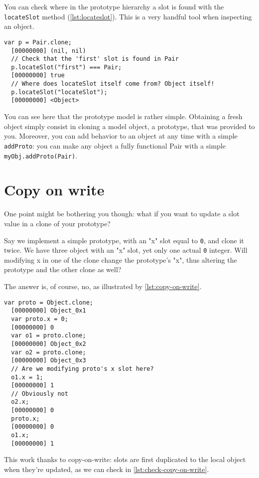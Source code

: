 \documentclass[openright,twoside,12pt]{report}
\begin{document}
You can check where in the prototype hierarchy a slot is found with
the \texttt{locateSlot} method (\autoref{lst:locateslot}). This is a very
handful tool when inspecting an object.

\begin{lstlisting}[caption=Using locateSlot, label=lst:locateslot]
  var p = Pair.clone;
  [00000000] (nil, nil)
  // Check that the 'first' slot is found in Pair
  p.locateSlot("first") === Pair;
  [00000000] true
  // Where does locateSlot itself come from? Object itself!
  p.locateSlot("locateSlot");
  [00000000] <Object>
\end{lstlisting}

You can see here that the prototype model is rather simple. Obtaining
a fresh object simply consist in cloning a model object, a prototype,
that was provided to you. Moreover, you can add behavior to an object
at any time with a simple \texttt{addProto}: you can make any object a
fully functional Pair with a simple \lstinline|myObj.addProto(Pair)|.

\section{Copy on write}

One point might be bothering you though: what if you want to update a
slot value in a clone of your prototype?

Say we implement a simple prototype, with an "x" slot equal to
\lstinline|0|, and clone it twice. We have three object with an "x"
slot, yet only one actual \lstinline|0| integer. Will modifying x in
one of the clone change the prototype's "x", thus altering the
prototype and the other clone as well?

The answer is, of course, no, as illustrated by \autoref{lst:copy-on-write}.

\begin{lstlisting}[caption=Copy on write in action,
  label=lst:copy-on-write]
  var proto = Object.clone;
  [00000000] Object_0x1
  var proto.x = 0;
  [00000000] 0
  var o1 = proto.clone;
  [00000000] Object_0x2
  var o2 = proto.clone;
  [00000000] Object_0x3
  // Are we modifying proto's x slot here?
  o1.x = 1;
  [00000000] 1
  // Obviously not
  o2.x;
  [00000000] 0
  proto.x;
  [00000000] 0
  o1.x;
  [00000000] 1
\end{lstlisting}

This work thanks to copy-on-write: slots are first duplicated to the
local object when they're updated, as we can check in
\autoref{lst:check-copy-on-write}.
\end{document}

